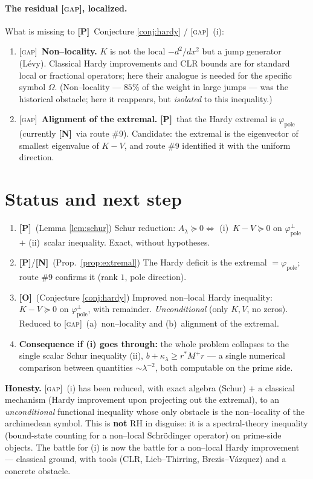 \documentclass[11pt]{article}
\newcommand{\PR}{\textcolor{green!55!black}{\textbf{[P]}}}
\newcommand{\NM}{\textcolor{blue!70!black}{\textbf{[N]}}}
\newcommand{\OP}{\textcolor{red!75!black}{\textbf{[O]}}}
\newcommand{\GAP}{\textcolor{red!75!black}{\textsc{[gap]}}}
\theoremstyle{plain}
\theoremstyle{definition}
\newcommand{\kin}{K}
\newcommand{\vv}{V}
\newcommand{\fp}{\varphi_{\mathrm{pole}}}
\begin{document}
\paragraph{The residual \GAP, localized.}
What is missing to \PR\ Conjecture \ref{conj:hardy} / \GAP\ (i):
\begin{enumerate}[label=(\alph*),leftmargin=2em]
\item \GAP\ \textbf{Non--locality.} $\kin$ is not the local $-d^2/dx^2$ but a jump
generator (Lévy). Classical Hardy improvements and CLR bounds are for standard local
or fractional operators; here their analogue is needed for the specific symbol
$\Omega$. (Non--locality --- $85\%$ of the weight in large jumps --- was the
historical obstacle; here it reappears, but \emph{isolated} to this inequality.)
\item \GAP\ \textbf{Alignment of the extremal.} \PR\ that the Hardy extremal
is $\fp$ (currently \NM\ via route \#9). Candidate: the extremal is the eigenvector of
smallest eigenvalue of $\kin-\vv$, and route \#9 identified it with the uniform
direction.
\end{enumerate}

\section{Status and next step}\label{sec:status}

\begin{enumerate}[leftmargin=1.6em]
\item \PR\ (Lemma \ref{lem:schur}) Schur reduction: $A_\lambda\succeq0\Leftrightarrow$
(i)~$\kin-\vv\succeq0$ on $\fp^\perp$ $+$ (ii)~scalar inequality. Exact, without
hypotheses.
\item \PR/\NM\ (Prop.\ \ref{prop:extremal}) The Hardy deficit is the extremal
$=\fp$; route \#9 confirms it (rank $1$, pole direction).
\item \OP\ (Conjecture \ref{conj:hardy}) Improved non--local Hardy inequality:
$\kin-\vv\succeq0$ on $\fp^\perp$, with remainder. \emph{Unconditional} (only $K,V$, no
zeros). Reduced to \GAP\ (a)~non--locality and (b)~alignment of the extremal.
\item \textbf{Consequence if (i) goes through:} the whole problem collapses to the
single scalar Schur inequality (ii), $b+\kappa_\lambda\ge r^*M^+r$ --- a single
numerical comparison between quantities $\sim\lambda^{-2}$, both computable on the
prime side.
\end{enumerate}

\noindent\textbf{Honesty.} \GAP\ (i) has been reduced, with exact algebra
(Schur) $+$ a classical mechanism (Hardy improvement upon projecting out the
extremal), to an \emph{unconditional} functional inequality whose only obstacle is the
non--locality of the archimedean symbol. This is \textbf{not} RH in disguise: it is a
spectral-theory inequality (bound-state counting for a non--local Schrödinger
operator) on prime-side objects. The battle for (i) is now the battle for a
non--local Hardy improvement --- classical ground, with tools (CLR, Lieb--Thirring,
Brezis--Vázquez) and a concrete obstacle.
\end{document}
